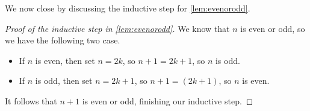 We now close by discussing the inductive step for \autoref{lem:evenorodd}.
\begin{proof}[Proof of the inductive step in \autoref{lem:evenorodd}]
	We know that $n$ is even or odd, so we have the following two case.
	\begin{itemize}
		\item If $n$ is even, then set $n=2k$, so $n+1=2k+1$, so $n$ is odd.
		\item If $n$ is odd, then set $n=2k+1$, so $n+1=(2k+1)$, so $n$ is even.
	\end{itemize}
	It follows that $n+1$ is even or odd, finishing our inductive step.
\end{proof}